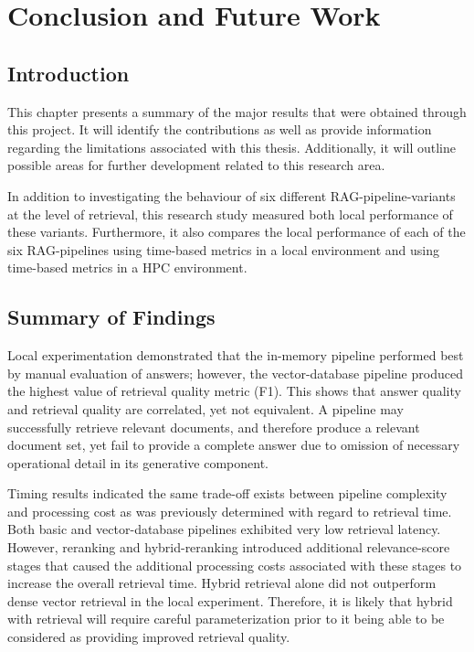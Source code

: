 \chapter{Conclusion and Future Work}

\section{Introduction}

This chapter presents a summary of the major results that were obtained through this project. It will identify the contributions as well as provide information regarding the limitations associated with this thesis. Additionally, it will outline possible areas for further development related to this research area.

In addition to investigating the behaviour of six different \ac{RAG}-pipeline-variants at the level of retrieval, this research study measured both local performance of these variants. Furthermore, it also compares the local performance of each of the six \ac{RAG}-pipelines using time-based metrics in a local environment and using time-based metrics in a \acf{HPC} environment.

\section{Summary of Findings}

Local experimentation demonstrated that the in-memory pipeline performed best by manual evaluation of answers; however, the vector-database pipeline produced the highest value of retrieval quality metric (F1). This shows that answer quality and retrieval quality are correlated, yet not equivalent. A pipeline may successfully retrieve relevant documents, and therefore produce a relevant document set, yet fail to provide a complete answer due to omission of necessary operational detail in its generative component.

Timing results indicated the same trade-off exists between pipeline complexity and processing cost as was previously determined with regard to retrieval time. Both basic and vector-database pipelines exhibited very low retrieval latency. However, reranking and hybrid-reranking introduced additional relevance-score stages that caused the additional processing costs associated with these stages to increase the overall retrieval time. Hybrid retrieval alone did not outperform dense vector retrieval in the local experiment. Therefore, it is likely that hybrid with retrieval will require careful parameterization prior to it being able to be considered as providing improved retrieval quality.

